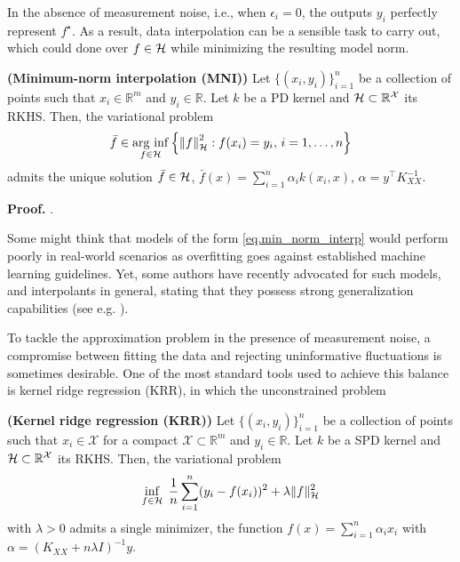 In the absence of measurement noise, i.e., when $\epsilon_i = 0$, the outputs $y_i$ perfectly represent $f^\star$. As a result, data interpolation can be a sensible task to carry out, which could done over $f \in \mathcal{H}$ while minimizing the resulting model norm.
\begin{proposition}
	\textbf{(Minimum-norm interpolation (MNI))}
	Let $\{(x_i,y_i)\}_{i=1}^n$ be a collection of points such that $x_i \in \mathbb{R}^m$ and $y_i \in \mathbb{R}$. Let $k$ be a PD kernel and $\mathcal{H} \subset \mathbb{R}^\mathcal{X}$ its RKHS. Then, the variational problem
	\begin{equation}
		\label{eq.min_norm_interp}
			\bar{f} \in \operatorname*{\arg\,\inf}_{f \in \mathcal{H}} \left\{ \left\| f \right\|_\mathcal{H}^2 : f(x_i) = y_i, \, i = 1,\dots,n \right\}
	\end{equation}
	admits the unique solution $\bar f \in \mathcal{H}$, $\bar f(x) =  \sum_{i=1}^n \alpha_i k(x_i,x)$, $\alpha = y^\top K_{XX}^{-1}$.
\end{proposition}
\begin{my_proof}
	\textbf{Proof.}
	\cite[Theorem~3.5]{kanagawa2018gaussian}.
\end{my_proof}

\begin{remark}
	Some might think that models of the form \eqref{eq.min_norm_interp} would perform poorly in real-world scenarios as overfitting goes against established machine learning guidelines. Yet, some authors have recently advocated for such models, and interpolants in general, stating that they possess strong generalization capabilities (see e.g. \cite{belkin2018understand,belkin2019reconciling,beaglehole2022kernel}).
\end{remark}

To tackle the approximation problem in the presence of measurement noise, a compromise between fitting the data and rejecting uninformative fluctuations is sometimes desirable. One of the most standard tools used to achieve this balance is kernel ridge regression (KRR), in which the unconstrained problem

\begin{proposition}
	\textbf{(Kernel ridge regression (KRR))}
	Let $\{(x_i,y_i)\}_{i=1}^n$ be a collection of points such that $x_i \in \mathcal{X}$ for a compact $\mathcal{X} \subset \mathbb{R}^m$ and $y_i \in \mathbb{R}$. Let $k$ be a SPD kernel and $\mathcal{H} \subset \mathbb{R}^\mathcal{X}$ its RKHS. Then, the variational problem
	\begin{equation}
		\inf_{f\in \mathcal{H}} \; \frac{1}{n} \sum_{i=1}^n (y_i - f(x_i))^2 + \lambda \Vert f \Vert_{\mathcal{H}}^2
		\label{eq.krr_model}
	\end{equation}
	with $\lambda > 0$ admits a single minimizer, the function $f(x) = \sum_{i=1}^n \alpha_i x_i$ with $\alpha = (K_{XX} + n \lambda I)^{-1} y$. 
\end{proposition}


